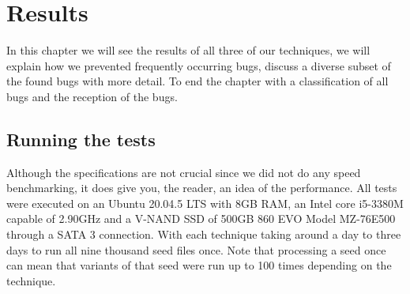 \chapter{Results}
\label{cha:res}
\label{res:Intro}
In this chapter we will see the results of all three of our techniques, we will explain how we prevented frequently occurring bugs, discuss a diverse subset of the found bugs with more detail. To end the chapter with a classification of all bugs and the reception of the bugs.

\section{Running the tests}
\label{res:RunningTests}
\label{res:Specs}
Although the specifications are not crucial since we did not do any speed benchmarking, it does give you, the reader, an idea of the performance. All tests were executed on an Ubuntu 20.04.5 LTS with 8GB RAM, an Intel core i5-3380M capable of 2.90GHz and a V-NAND SSD of 500GB 860 EVO Model MZ-76E500 through a SATA 3 connection. With each technique taking around a day to three days to run all nine thousand seed files once. Note that processing a seed once can mean that variants of that seed were run up to 100 times depending on the technique.


